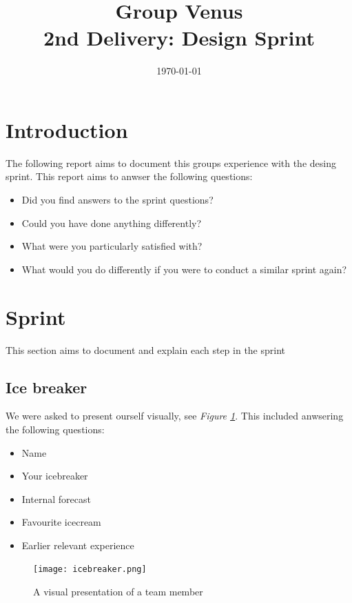 \documentclass[12pt]{article}
\title{\textbf{Group Venus} \\ 2nd Delivery: Design Sprint}
\date{\today}
\begin{document}
\subsectionfont{\fontsize{12}{14}\selectfont}

\maketitle

\tableofcontents

\section{Introduction}
The following report aims to document this groups experience with the desing sprint\cite{DesignSprint2024}.
This report aims to anwser the following questions:
\begin{itemize}
    \item Did you find answers to the sprint questions?
    \item Could you have done anything differently?
    \item What were you particularly satisfied with?
    \item What would you do differently if you were to conduct a similar sprint again?
\end{itemize}

\section{Sprint}
This section aims to document and explain each step in the sprint

\subsection{Ice breaker}
We were asked to present ourself visually, see \textit{Figure \ref{fig:IB}}.
This included anwsering the following questions:
\begin{itemize}
    \item Name
    \item Your icebreaker
    \item Internal forecast
    \item Favourite icecream
    \item Earlier relevant experience
\end{itemize}
\begin{figure}[h]
    \begin{adjustwidth}{-1in}{-1in}
        \centering
        \texttt{[image: icebreaker.png]}
        \caption{A visual presentation of a team member}
        \label{fig:IB}
    \end{adjustwidth}
\end{figure}
\clearpage
\end{document}
